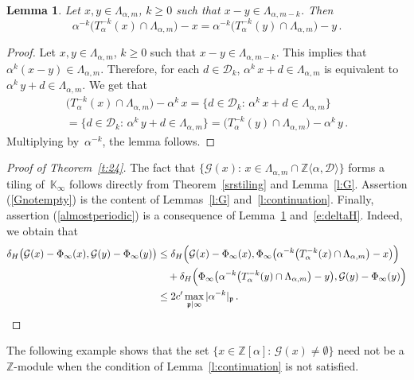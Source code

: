 \documentclass[12pt]{amsart}
\newtheorem{lemma}{Lemma}[section]
\theoremstyle{definition}
\theoremstyle{remark}
\numberwithin{equation}{section}
\begin{document}
\begin{lemma} \label{l:xminusy}
Let $x, y \in \Lambda_{\alpha,m}$, $k \ge 0$ such that $x-y \in \Lambda_{\alpha,m-k}$.
Then
\[
\alpha^{-k} \big(T_\alpha^{-k}(x) \cap \Lambda_{\alpha,m}\big) - x = \alpha^{-k} \big(T_\alpha^{-k}(y) \cap \Lambda_{\alpha,m}\big) - y\,.
\]
\end{lemma}

\begin{proof}
Let $x, y \in \Lambda_{\alpha,m}$, $k \ge 0$ such that $x-y \in \Lambda_{\alpha,m-k}$.
This implies that $\alpha^k (x-y) \in \Lambda_{\alpha,m}$.
Therefore, for each $d \in \mathcal{D}_k$, $\alpha^k\, x + d \in \Lambda_{\alpha,m}$ is equivalent to $\alpha^k\, y + d \in \Lambda_{\alpha,m}$.
We get that
\begin{multline*}
\big(T_\alpha^{-k}(x) \cap \Lambda_{\alpha,m}\big) - \alpha^k\, x = \{d \in \mathcal{D}_k:\, \alpha^k\, x + d \in \Lambda_{\alpha,m}\} \\
= \{d \in \mathcal{D}_k:\, \alpha^k\, y + d \in \Lambda_{\alpha,m}\} = \big(T_\alpha^{-k}(y) \cap \Lambda_{\alpha,m}\big) - \alpha^k\, y\,.
\end{multline*}
Multiplying by~$\alpha^{-k}$, the lemma follows.
\end{proof}

\begin{proof}[{Proof of Theorem~\ref{t:24}}]
The fact that $\{\mathcal{G}(x):\, x \in \Lambda_{\alpha,m} \cap \mathbb{Z}\langle \alpha, \mathcal{D}\rangle\}$ forms a tiling of~$\mathbb{K}_\infty$ follows directly from Theorem~\ref{srstiling} and Lemma~\ref{l:G}.
Assertion (\ref{Gnotempty}) is the content of Lemmas~\ref{l:G} and~\ref{l:continuation}.
Finally, assertion (\ref{almostperiodic}) is a consequence of Lemma~\ref{l:xminusy} and~\eqref{e:deltaH}.
Indeed, we obtain that
\begin{align*}
\delta_H\big(\mathcal{G}(x) - \Phi_\infty(x), \mathcal{G}(y) - \Phi_\infty(y)\big) & \le \delta_H\Big(\mathcal{G}(x) - \Phi_\infty(x), \Phi_\infty\big(\alpha^{-k} \big(T_\alpha^{-k}(x) \cap \Lambda_{\alpha,m}\big) - x\big)\Big) \\
& \quad + \delta_H\Big(\Phi_\infty\big(\alpha^{-k} \big(T_\alpha^{-k}(y) \cap \Lambda_{\alpha,m}\big) - y\big), \mathcal{G}(y) - \Phi_\infty(y)\Big) \\
& \le 2 c' \max_{\mathfrak{p}\mid\infty} |\alpha^{-k}|_\mathfrak{p}\,. \qedhere
\end{align*}
\end{proof}

The following example shows that the set $\{x \in \mathbb{Z}[\alpha]:\, \mathcal{G}(x) \neq \emptyset\}$ need not be a $\mathbb{Z}$-module when the condition of Lemma~\ref{l:continuation} is not satisfied.
\end{document}
